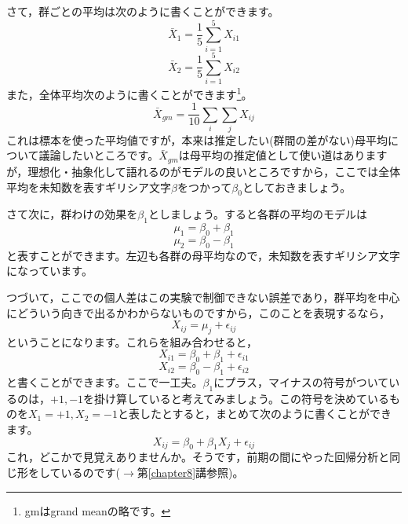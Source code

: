 \documentclass{ltjbook}
\begin{document}

さて，群ごとの平均は次のように書くことができます。
\[ \bar{X}_1 =\frac{1}{5} \sum_{i=1}^5 X_{i1} \]
\[ \bar{X}_2 =\frac{1}{5} \sum_{i=1}^5 X_{i2} \]
また，全体平均次のように書くことができます\footnote{gmはgrand meanの略です。}。
\[ \bar{X}_{gm} = \frac{1}{10} \sum_{i} \sum_{j} X_{ij} \]
これは標本を使った平均値ですが，本来は推定したい(群間の差がない)母平均について議論したいところです。$\bar{X}_{gm}$は母平均の推定値として使い道はありますが，理想化・抽象化して語れるのがモデルの良いところですから，ここでは全体平均を未知数を表すギリシア文字$\beta$をつかって$\beta_0$としておきましょう。

さて次に，群わけの効果を$\beta_1$としましょう。すると各群の平均のモデルは
\[ \mu_1= \beta_0 + \beta_1 \]
\[ \mu_2 = \beta_0  -\beta_1 \]
と表すことができます。左辺も各群の母平均なので，未知数を表すギリシア文字になっています。

つづいて，ここでの個人差はこの実験で制御できない誤差であり，群平均を中心にどういう向きで出るかわからないものですから，このことを表現するなら，
\[ X_{ij} = \mu_j + \epsilon_{ij} \]
ということになります。これらを組み合わせると，
\[ X_{i1} = \beta_0 + \beta_1 + \epsilon_{i1} \]
\[ X_{i2} = \beta_0 - \beta_1 + \epsilon_{i2} \]
と書くことができます。ここで一工夫。$\beta_1$にプラス，マイナスの符号がついているのは，$+1,-1$を掛け算していると考えてみましょう。この符号を決めているものを$X_{1}=+1,X_{2}=-1$と表したとすると，まとめて次のように書くことができます。
\begin{equation}
    \label{eq::21_1}
     X_{ij} = \beta_0 +  \beta_1 X_{j} + \epsilon_{ij} 
\end{equation}
これ，どこかで見覚えありませんか。そうです，前期の間にやった回帰分析と同じ形をしているのです($\to$第\ref{chapter8}講参照)。
\end{document}
